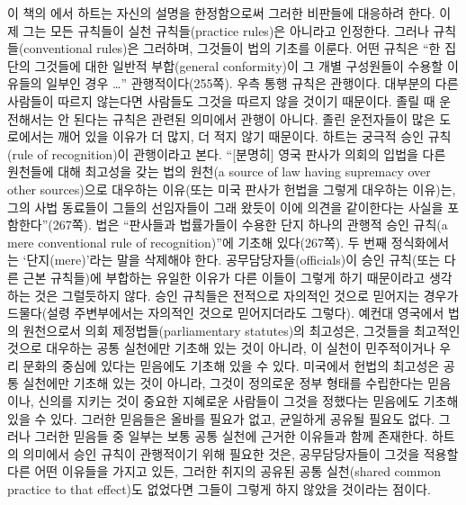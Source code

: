 이 책의 에서 하트는 자신의 설명을 한정함으로써
그러한 비판들에 대응하려 한다. 이제 그는 모든 규칙들이 실천
규칙들(practice rules)은 아니라고 인정한다. 그러나 
규칙들(conventional rules)은 그러하며, 그것들이 법의 기초를 이룬다. 어떤
규칙은 “한 집단의 그것들에 대한 일반적 부합(general conformity)이 그
개별 구성원들이 수용할 이유들의 일부인 경우 \ldots{}”
관행적이다(255쪽). 우측 통행 규칙은 관행이다. 대부분의 다른 사람들이
따르지 않는다면 사람들도 그것을 따르지 않을 것이기 때문이다. 졸릴 때
운전해서는 안 된다는 규칙은 관련된 의미에서 관행이 아니다. 졸린
운전자들이 많은 도로에서는 깨어 있을 이유가 더 많지, 더 적지 않기
때문이다. 하트는 궁극적 승인 규칙(rule of recognition)이 관행이라고
본다. “{[}분명히{]} 영국 판사가 의회의 입법을 다른 원천들에 대해
최고성을 갖는 법의 원천(a source of law having supremacy over other
sources)으로 대우하는 이유(또는 미국 판사가 헌법을 그렇게 대우하는
이유)는, 그의 사법 동료들이 그들의 선임자들이 그래 왔듯이 이에 의견을
같이한다는 사실을 포함한다”(267쪽). 법은 “판사들과 법률가들이 수용한
단지 하나의 관행적 승인 규칙(a mere conventional rule of
recognition)”에 기초해 있다(267쪽). 두 번째 정식화에서는
‘단지(mere)’라는 말을 삭제해야 한다. 공무담당자들(officials)이 승인
규칙(또는 다른 근본 규칙들)에 부합하는 유일한 이유가 다른 이들이 그렇게
하기 때문이라고 생각하는 것은 그럴듯하지 않다. 승인 규칙들은 전적으로
자의적인 것으로 믿어지는 경우가 드물다(설령 주변부에서는 자의적인 것으로
믿어지더라도 그렇다). 예컨대 영국에서 법의 원천으로서 의회
제정법들(parliamentary statutes)의 최고성은, 그것들을 최고적인 것으로
대우하는 공통 실천에만 기초해 있는 것이 아니라, 이 실천이 민주적이거나
우리 문화의 중심에 있다는 믿음에도 기초해 있을 수 있다. 미국에서 헌법의
최고성은 공통 실천에만 기초해 있는 것이 아니라, 그것이 정의로운 정부
형태를 수립한다는 믿음이나, 신의를 지키는 것이 중요한 지혜로운 사람들이
그것을 정했다는 믿음에도 기초해 있을 수 있다. 그러한 믿음들은 올바를
필요가 없고, 균일하게 공유될 필요도 없다. 그러나 그러한 믿음들 중 일부는
보통 공통 실천에 근거한 이유들과 함께 존재한다. 하트의 의미에서 승인
규칙이 관행적이기 위해 필요한 것은, 공무담당자들이 그것을 적용할 다른
어떤 이유들을 가지고 있든, 그러한 취지의 공유된 공통 실천(shared common
practice to that effect)도 없었다면 그들이 그렇게 하지 않았을 것이라는
점이다.

